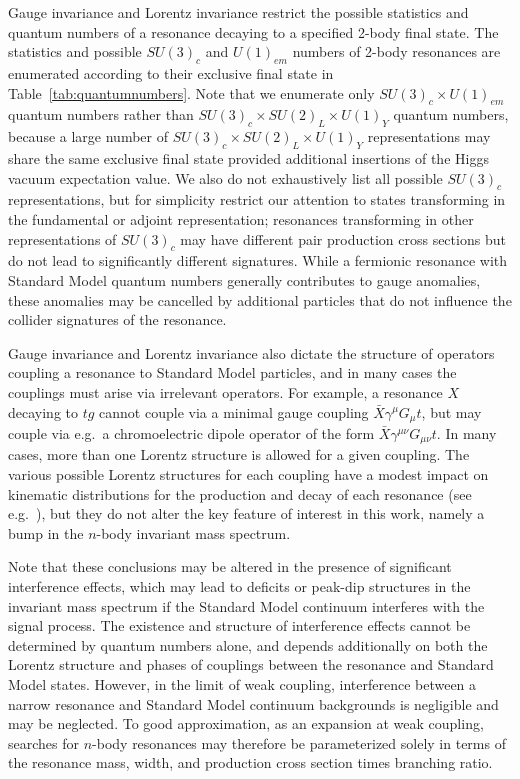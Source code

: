 Gauge invariance and Lorentz invariance restrict the possible statistics and quantum numbers of a resonance decaying to a specified 2-body final state. The statistics and possible $SU(3)_c$ and $U(1)_{em}$ numbers of 2-body resonances are enumerated according to their exclusive final state in Table~\ref{tab:quantumnumbers}. Note that we enumerate only $SU(3)_c \times U(1)_{em}$ quantum numbers rather than $SU(3)_c \times SU(2)_L \times U(1)_Y$ quantum numbers, because a large number of $SU(3)_c \times SU(2)_L \times U(1)_Y$ representations may share the same exclusive final state provided additional insertions of the Higgs vacuum expectation value. We also do not exhaustively list all possible $SU(3)_c$ representations, but for simplicity restrict our attention to states transforming in the fundamental or adjoint representation; resonances transforming in other representations of $SU(3)_c$ may have different pair production cross sections but do not lead to significantly different signatures. While a fermionic resonance with Standard Model quantum numbers generally contributes to gauge anomalies, these anomalies may be cancelled by additional particles that do not influence the collider signatures of the resonance. 

Gauge invariance and Lorentz invariance also dictate the structure of operators coupling a resonance to Standard Model particles, and in many cases the couplings must arise via irrelevant operators. For example, a resonance $X$ decaying to $tg$ cannot couple via a minimal gauge coupling $ \bar X \gamma^\mu G_\mu t$, but may couple via e.g.~a chromoelectric dipole operator of the form $\bar X \gamma^{\mu \nu} G_{\mu \nu} t$. In many cases, more than one Lorentz structure is allowed for a given coupling. The various possible Lorentz structures for each coupling have a modest impact on kinematic distributions for the production and decay of each resonance (see e.g.~\cite{ArkaniHamed:2007fw}), but they do not alter the key feature of interest in this work, namely a bump in the $n$-body invariant mass spectrum. 

Note that these conclusions may be altered in the presence of significant interference effects, which may lead to deficits or peak-dip structures in the invariant mass spectrum if the Standard Model continuum interferes with the signal process. The existence and structure of interference effects cannot be determined by quantum numbers alone, and depends additionally on both the Lorentz structure and phases of couplings between the resonance and Standard Model states. However, in the limit of weak coupling, interference between a narrow resonance and Standard Model continuum backgrounds is negligible and may be neglected. To good approximation, as an expansion at weak coupling, searches for $n$-body resonances may therefore be parameterized solely in terms of the resonance mass, width, and production cross section times branching ratio.

